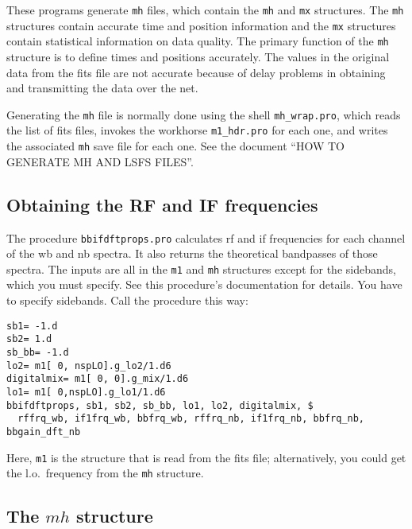 \documentclass[psfig,preprint]{aastex}
\begin{document}
	These programs generate \verb$mh$ files, which contain the
\verb$mh$ and \verb$mx$ structures. The \verb$mh$ structures contain
accurate time and position information and the \verb$mx$ structures
contain statistical information on data quality.  The primary function
of the \verb$mh$ structure is to define times and positions accurately.
The values in the original data from the fits file are not accurate
because of delay problems in obtaining and transmitting the data over
the net.

	Generating the \verb$mh$ file is normally done using the shell
\verb$mh_wrap.pro$, which reads the list of fits files, invokes the
workhorse \verb$m1_hdr.pro$ for each one, and writes the associated
\verb$mh$ save file for each one.  See the document ``HOW TO GENERATE MH
AND LSFS FILES''.

\subsection{Obtaining the RF and IF frequencies}

	The procedure \verb$bbifdftprops.pro$ calculates rf and if
frequencies for each channel of the wb and nb spectra. It also returns
the theoretical bandpasses of those spectra. The inputs are all in the
\verb$m1$ and \verb$mh$ structures except for the sidebands, which you
must specify. See this procedure's documentation for details. You have
to specify sidebands. Call the procedure this way: 
\begin{verbatim}
sb1= -1.d
sb2= 1.d
sb_bb= -1.d
lo2= m1[ 0, nspLO].g_lo2/1.d6
digitalmix= m1[ 0, 0].g_mix/1.d6
lo1= m1[ 0,nspLO].g_lo1/1.d6
bbifdftprops, sb1, sb2, sb_bb, lo1, lo2, digitalmix, $
  rffrq_wb, if1frq_wb, bbfrq_wb, rffrq_nb, if1frq_nb, bbfrq_nb, bbgain_dft_nb
\end{verbatim}
\noindent Here, \verb$m1$ is the structure that is read from the fits
file; alternatively, you could get the l.o.\ frequency from the 
\verb$mh$ structure.

\subsection{The $mh$ structure}
\end{document}

